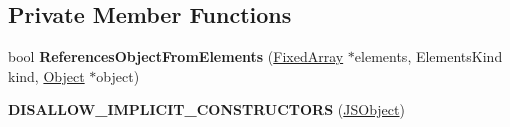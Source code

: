 \subsection*{Private Member Functions}
\begin{DoxyCompactItemize}
\item 
bool {\bfseries References\+Object\+From\+Elements} (\hyperlink{classv8_1_1internal_1_1_fixed_array}{Fixed\+Array} $\ast$elements, Elements\+Kind kind, \hyperlink{classv8_1_1internal_1_1_object}{Object} $\ast$object)\hypertarget{classv8_1_1internal_1_1_j_s_object_a954b74a6b6f9c23c4af217373b7653c1}{}\label{classv8_1_1internal_1_1_j_s_object_a954b74a6b6f9c23c4af217373b7653c1}

\item 
{\bfseries D\+I\+S\+A\+L\+L\+O\+W\+\_\+\+I\+M\+P\+L\+I\+C\+I\+T\+\_\+\+C\+O\+N\+S\+T\+R\+U\+C\+T\+O\+RS} (\hyperlink{classv8_1_1internal_1_1_j_s_object}{J\+S\+Object})\hypertarget{classv8_1_1internal_1_1_j_s_object_a38b9592344961449087487998ea4345c}{}\label{classv8_1_1internal_1_1_j_s_object_a38b9592344961449087487998ea4345c}

\end{DoxyCompactItemize}
